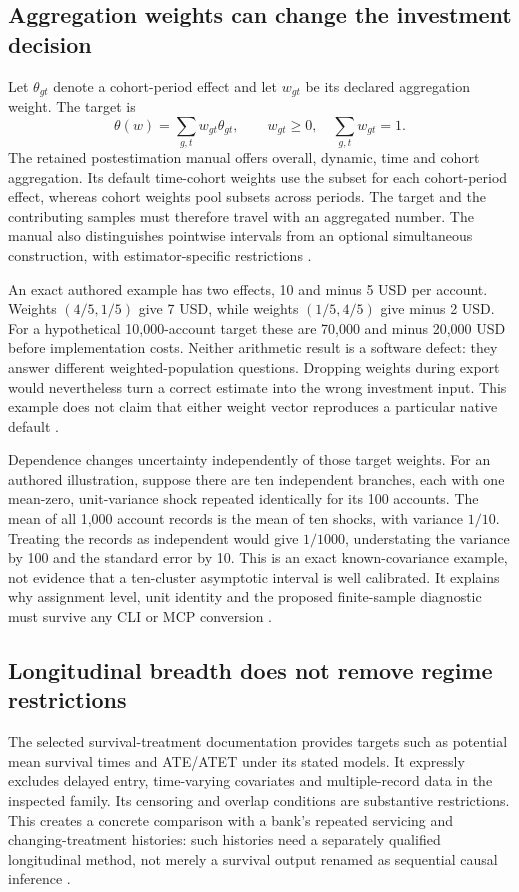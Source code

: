 \subsection{Aggregation weights can change the investment decision}
Let $\theta_{gt}$ denote a cohort-period effect and let $w_{gt}$ be its
declared aggregation weight. The target is
\[
 \theta(w)=\sum_{g,t} w_{gt}\theta_{gt},\qquad
 w_{gt}\geq0,\quad\sum_{g,t}w_{gt}=1.
\]
The retained postestimation manual offers overall, dynamic, time and cohort
aggregation. Its default time-cohort weights use the subset for each
cohort-period effect, whereas cohort weights pool subsets across periods.
The target and the contributing samples must therefore travel with an
aggregated number. The manual also distinguishes pointwise intervals from
an optional simultaneous construction, with estimator-specific restrictions
\citep{exec18_gp_stata_post}.

An exact authored example has two effects, 10 and minus 5 USD per account.
Weights $(4/5,1/5)$ give 7 USD, while weights $(1/5,4/5)$ give minus
2 USD. For a hypothetical 10,000-account target these are 70,000 and minus
20,000 USD before implementation costs. Neither arithmetic result is a
software defect: they answer different weighted-population questions.
Dropping weights during export would nevertheless turn a correct estimate
into the wrong investment input. This example does not claim that either
weight vector reproduces a particular native default
\citep{exec24_stata_choice}.

Dependence changes uncertainty independently of those target weights.
For an authored illustration, suppose there are ten independent branches,
each with one mean-zero, unit-variance shock repeated identically for its
100 accounts. The mean of all 1,000 account records is the mean of ten
shocks, with variance $1/10$. Treating the records as independent would
give $1/1000$, understating the variance by 100 and the standard error by
10. This is an exact known-covariance example, not evidence that a
ten-cluster asymptotic interval is well calibrated. It explains why
assignment level, unit identity and the proposed finite-sample diagnostic
must survive any CLI or MCP conversion \citep{exec24_stata_choice}.

\subsection{Longitudinal breadth does not remove regime restrictions}
The selected survival-treatment documentation provides targets such as
potential mean survival times and ATE/ATET under its stated models. It
expressly excludes delayed entry, time-varying covariates and multiple-record
data in the inspected family. Its censoring and overlap conditions are
substantive restrictions. This creates a concrete comparison with a bank's
repeated servicing and changing-treatment histories: such histories need
a separately qualified longitudinal method, not merely a survival output
renamed as sequential causal inference
\citep{exec14_survival_stata,exec24_stata_choice}.

